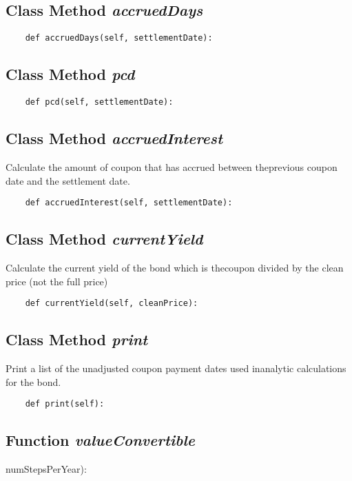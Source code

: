 \documentclass[twoside,11pt]{book}
\begin{document}
\subsection{Class Method {\it accruedDays}}


\begin{lstlisting}
    def accruedDays(self, settlementDate):
\end{lstlisting}

\subsection{Class Method {\it pcd}}


\begin{lstlisting}
    def pcd(self, settlementDate):
\end{lstlisting}

\subsection{Class Method {\it accruedInterest}}
Calculate the amount of coupon that has accrued between theprevious coupon date and the settlement date. 

\begin{lstlisting}
    def accruedInterest(self, settlementDate):
\end{lstlisting}

\subsection{Class Method {\it currentYield}}
Calculate the current yield of the bond which is thecoupon divided by the clean price (not the full price)

\begin{lstlisting}
    def currentYield(self, cleanPrice):
\end{lstlisting}

\subsection{Class Method {\it print}}
Print a list of the unadjusted coupon payment dates used inanalytic calculations for the bond. 

\begin{lstlisting}
    def print(self):
\end{lstlisting}

\subsection{Function {\it valueConvertible}}
numStepsPerYear):
\end{document}

